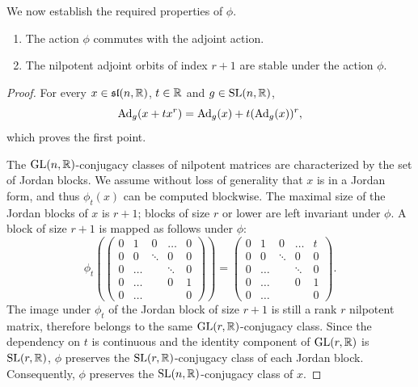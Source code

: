 \documentclass[english]{article}
\begin{document}
We now establish the required properties of $\phi$.
\begin{lemma}
    \begin{enumerate}
        \item The action $\phi$ commutes with the adjoint action.
        \item The nilpotent adjoint orbits of index $r+1$ are stable under the action $\phi$.
    \end{enumerate}
\end{lemma}
\begin{proof}
    For every $x\in \mathfrak{sl}(n,\mathbb{R})$, $t\in \mathbb{R}$ and $g\in \operatorname{SL}(n, \mathbb{R})$, 
    \[
        \operatorname{Ad}_g(x + t x^r) = \operatorname{Ad}_g (x) + t (\operatorname{Ad}_g(x))^r
    ,\]
    which proves the first point.

    The $\operatorname{GL}(n, \mathbb{R})$-conjugacy classes of nilpotent matrices are characterized by the set of Jordan blocks. We assume without loss of generality that $x$ is in a Jordan form, and thus $\phi_t(x)$ can be computed blockwise.
    The maximal size of the Jordan blocks of $x$ is $r+1$; blocks of size $r$ or lower are left invariant under $\phi$. A block of size $r+1$ is mapped as follows under $\phi$:
    \[
        \phi_t\left( 
            \begin{pmatrix}
                0 & 1 & 0 & \dots & 0 \\
                0 & 0 & \ddots & 0 & 0\\
                0 & \dots &  & \ddots & 0\\
                0 & \dots &    &  0 & 1\\
                0 & \dots &    &    & 0
            \end{pmatrix}
            \right)
    = 
            \begin{pmatrix}
                0 & 1 & 0 & \dots & t \\
                0 & 0 & \ddots & 0 & 0\\
                0 & \dots &  & \ddots & 0\\
                0 & \dots &    &  0 & 1\\
                0 & \dots &    &    & 0
            \end{pmatrix}
    .\]
    The image under $\phi_t$ of the Jordan block of size $r+1$ is still a rank $r$ nilpotent matrix,
    therefore belongs to the same $\operatorname{GL}(r, \mathbb{R})$-conjugacy class. 
    Since the dependency on $t$ is continuous and the identity component of $\operatorname{GL}(r, \mathbb{R})$ is $\operatorname{SL}(r, \mathbb{R})$, $\phi$ preserves the $\operatorname{SL}(r, \mathbb{R})$-conjugacy class of each Jordan block.
    Consequently, $\phi$ preserves the $\operatorname{SL}(n, \mathbb{R})$-conjugacy class of $x$.
\end{proof}    
\end{document}
